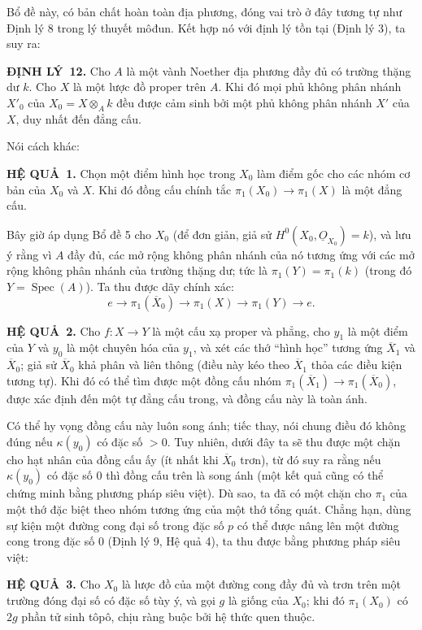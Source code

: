 \documentclass[11pt,twoside,openany]{book}
\numberwithin{equation}{section}
\newcommand{\src}[1]{%
  \phantomsection\hypertarget{src:\fgasourceid:#1}{}%
  \marginpar{\raggedleft\footnotesize\sffamily #1}%
}
\newcommand{\fgasourceid}{unset}
\newcommand{\Osh}{\underline{O}}
\newcommand{\result}[2]{\par\medskip\noindent\textbf{#1\if\relax\detokenize{#2}\relax\else\ #2\fi.}\quad}
\begin{document}
Bổ đề này, có bản chất hoàn toàn địa phương, đóng vai trò ở đây tương tự như
Định lý 8 trong lý thuyết môđun. Kết hợp nó với định lý tồn tại (Định lý 3),
ta suy ra:

\result{ĐỊNH LÝ}{12} Cho $A$ là một vành Noether địa phương đầy đủ có trường
thặng dư $k$. Cho $X$ là một lược đồ proper trên $A$. Khi đó mọi phủ không
phân nhánh $X'_0$ của $X_0=X\otimes_A k$ đều được cảm sinh bởi một phủ không
phân nhánh $X'$ của $X$, duy nhất đến đẳng cấu.

Nói cách khác:

\result{HỆ QUẢ}{1} Chọn một điểm hình học trong $X_0$ làm điểm gốc cho các
nhóm cơ bản của $X_0$ và $X$. Khi đó đồng cấu chính tắc
$\pi_1(X_0)\longrightarrow\pi_1(X)$ là một đẳng cấu.

Bây giờ áp dụng Bổ đề 5 cho $X_0$ (để đơn giản, giả sử
$H^0(X_0,\Osh_{X_0})=k$), và lưu ý rằng vì $A$ đầy đủ, các mở rộng không phân
nhánh của nó tương ứng với các mở rộng không phân nhánh của trường thặng dư;
tức là $\pi_1(Y)=\pi_1(k)$ (trong đó $Y=\operatorname{Spec}(A)$). Ta thu được
dãy chính xác:
\[
  e\longrightarrow\pi_1(\overline X_0)
  \longrightarrow\pi_1(X)\longrightarrow\pi_1(Y)\longrightarrow e.
\]

\result{HỆ QUẢ}{2} Cho $f:X\longrightarrow Y$ là một cấu xạ proper và phẳng,
cho $y_1$ là một điểm của $Y$ và $y_0$ là một chuyên hóa của $y_1$, và xét các
thớ “hình học” tương ứng $\overline X_1$ và $\overline X_0$; giả sử
$\overline X_0$ khả phân và liên thông (điều này kéo theo
$\overline X_1$ thỏa các điều kiện tương tự). Khi đó có thể tìm được một đồng
cấu nhóm
$\pi_1(\overline X_1)\longrightarrow\pi_1(\overline X_0)$, được xác định đến
một tự đẳng cấu trong, và đồng cấu này là toàn ánh.


\src{217}
Có thể hy vọng đồng cấu này luôn song ánh; tiếc thay, nói chung điều đó không
đúng nếu $\kappa(y_0)$ có đặc số $>0$. Tuy nhiên, dưới đây ta sẽ thu được một
chặn cho hạt nhân của đồng cấu ấy (ít nhất khi $\overline X_0$ trơn), từ đó suy
ra rằng nếu $\kappa(y_0)$ có đặc số $0$ thì đồng cấu trên là song ánh (một kết
quả cũng có thể chứng minh bằng phương pháp siêu việt). Dù sao, ta đã có một
chặn cho $\pi_1$ của một thớ đặc biệt theo nhóm tương ứng của một thớ tổng quát.
Chẳng hạn, dùng sự kiện một đường cong đại số trong đặc số $p$ có thể được nâng
lên một đường cong trong đặc số $0$ (Định lý 9, Hệ quả 4), ta thu được bằng
phương pháp siêu việt:

\result{HỆ QUẢ}{3} Cho $X_0$ là lược đồ của một đường cong đầy đủ và trơn trên
một trường đóng đại số có đặc số tùy ý, và gọi $g$ là giống của $X_0$; khi đó
$\pi_1(X_0)$ có $2g$ phần tử sinh tôpô, chịu ràng buộc bởi hệ thức quen thuộc.
\end{document}
